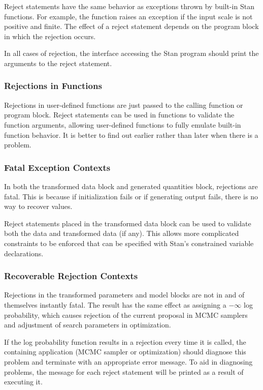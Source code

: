 Reject statements have the same behavior as exceptions thrown by
built-in Stan functions.  For example, the  function
raises an exception if the input scale is not positive and finite.
The effect of a reject statement depends on the program block in which
the rejection occurs.

In all cases of rejection, the interface accessing the Stan
program should print the arguments to the reject statement.

\subsubsection{Rejections in Functions}

Rejections in user-defined functions are just passed to the
calling function or program block.  Reject statements can be used in
functions to validate the function arguments, allowing user-defined
functions to fully emulate built-in function behavior.  It is better
to find out earlier rather than later when there is a problem.

\subsubsection{Fatal Exception Contexts}

In both the transformed data block and generated quantities block,
rejections are fatal.  This is because if initialization fails or if
generating output fails, there is no way to recover values.

Reject statements placed in the transformed data block can be used
to validate both the data and transformed data (if any).  This allows
more complicated constraints to be enforced that can be specified with
Stan's constrained variable declarations.


\subsubsection{Recoverable Rejection Contexts}

Rejections in the transformed parameters and model blocks are
not in and of themselves instantly fatal.  The result has the same
effect as assigning a $-\infty$ log probability, which causes
rejection of the current proposal in MCMC samplers and adjustment of
search parameters in optimization.

If the log probability function results in a rejection every time it is
called, the containing application (MCMC sampler or optimization)
should diagnose this problem and terminate with an appropriate error
message.  To aid in diagnosing problems, the message for each
reject statement will be printed as a result of executing it.



